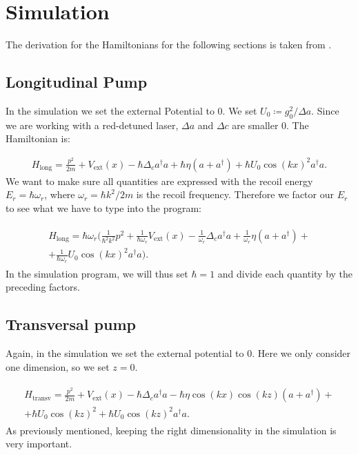 \section{Simulation}
The derivation for the Hamiltonians for the following sections is taken from \cite{donner}.

\subsection{Longitudinal Pump}
In the simulation we set the external Potential to 0. We set $U_0 \coloneqq g_0^2/\Delta a$. Since we are working with a red-detuned laser, $\Delta a$ and $\Delta c$ are smaller 0. The Hamiltonian is:

\begin{align}
H_\text{long} = \frac{p^2}{2m} + V_\text{ext}(x) - \hbar \Delta_c a^\dagger a + \hbar \eta (a + a^\dagger) + \hbar U_0 \cos(kx)^2 a^\dagger a.
\end{align}We want to make sure all quantities are expressed with the recoil energy $E_r = \hbar \omega_r$, where $\omega_r = \hbar k^2 / 2m$ is the recoil frequency. Therefore we factor our $E_r$ to see what we have to type into the program:

\begin{align}
\begin{split}
H_\text{long} = \hbar \omega_r \biggl( \frac{1}{\hbar^2 k^2} p^2 + \frac{1}{\hbar \omega_r} V_\text{ext}(x) - \frac{1}{\omega_r} \Delta_c a^\dagger a + \frac{1}{\omega_r} \eta (a + a^\dagger) + \\
 + \frac{1}{\hbar \omega_r} U_0 \cos(kx)^2 a^\dagger a \biggr).
\end{split}
\end{align}In the simulation program, we will thus set $\hbar = 1$ and divide each quantity by the preceding factors.

\subsection{Transversal pump}
Again, in the simulation we set the external potential to 0. Here we only consider one dimension, so we set $z=0$.

\begin{align}
\begin{split}
H_\text{transv} = \frac{p^2}{2m} + V_\text{ext}(x) - \hbar \Delta_c a^\dagger a - \hbar \eta \cos(kx) \cos(kz) (a + a^\dagger) + \\
 + \hbar U_0 \cos(kz)^2 + \hbar U_0 \cos(kz)^2 a^\dagger a.
\end{split}
\end{align}As previously mentioned, keeping the right dimensionality in the simulation is very important.

